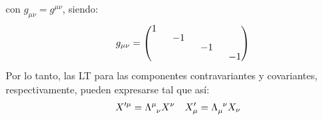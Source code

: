 con $g_{\mu\nu} = g^{\mu\nu}$, siendo:
\begin{equation*}
g_{\mu\nu} = 
\begingroup 
\renewcommand*{\arraystretch}{0.8}
\setlength\arraycolsep{8pt}
\begin{pmatrix}
1 & & &  \\
& -1 & & \\
& & -1 & \\
& & & -1
\end{pmatrix}
\endgroup
\end{equation*}
Por lo tanto, las LT para las componentes contravariantes y covariantes, respectivamente, pueden expresarse \cite{MCR} tal que así:
\begin{align}
X'^{\mu } &=\Lambda\indices{^\mu _\nu}X^\nu & X'_{\mu } &=\Lambda\indices{_\mu ^\nu}X_\nu \label{eq:LTcovariant}
\end{align}

